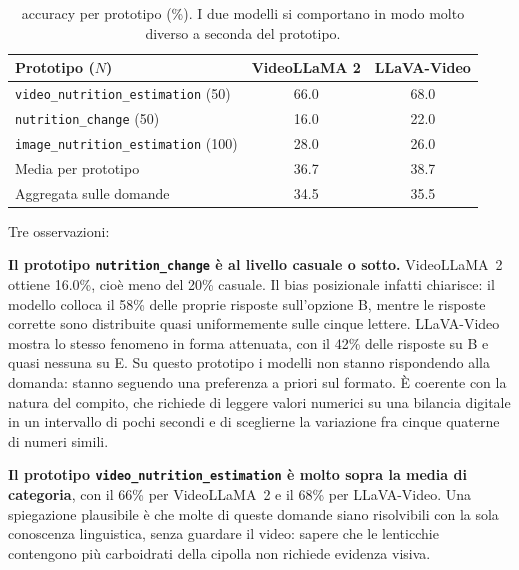 \documentclass{article}
\begin{document}
\begin{table}[htbp]
\centering
\small
\begin{tabular}{@{}lcc@{}}
\toprule
Prototipo ($N$) & VideoLLaMA 2 & LLaVA-Video \\
\midrule
\texttt{video\_nutrition\_estimation} (50) & 66.0 & 68.0 \\
\texttt{nutrition\_change} (50) & 16.0 & 22.0 \\
\texttt{image\_nutrition\_estimation} (100) & 28.0 & 26.0 \\
\midrule
Media per prototipo             & 36.7 & 38.7 \\
Aggregata sulle domande         & 34.5 & 35.5 \\
\bottomrule
\end{tabular}
\caption{accuracy per prototipo (\%). I due modelli si comportano in modo
molto diverso a seconda del prototipo.}
\label{tab:per-prototipo}
\end{table}

Tre osservazioni:

\textbf{Il prototipo \texttt{nutrition\_change} è al livello casuale o sotto.}
VideoLLaMA~2 ottiene 16.0\%, cioè meno del 20\% casuale. Il bias posizionale
infatti chiarisce: il modello colloca il 58\% delle proprie
risposte sull'opzione B, mentre le risposte corrette sono distribuite quasi
uniformemente sulle cinque lettere. LLaVA-Video mostra lo stesso fenomeno in
forma attenuata, con il 42\% delle risposte su B e quasi nessuna su E. Su questo
prototipo i modelli non stanno rispondendo alla domanda: stanno seguendo una
preferenza a priori sul formato. È coerente con la natura del compito, che
richiede di leggere valori numerici su una bilancia digitale in un intervallo di
pochi secondi e di sceglierne la variazione fra cinque quaterne di numeri simili.

\textbf{Il prototipo \texttt{video\_nutrition\allowbreak\_estimation} è molto sopra la media
di categoria}, con il 66\% per VideoLLaMA~2 e il 68\% per LLaVA-Video. Una spiegazione
plausibile è che molte di queste domande siano risolvibili con la sola conoscenza
linguistica, senza guardare il video: sapere che le lenticchie contengono più
carboidrati della cipolla non richiede evidenza visiva.
\end{document}
